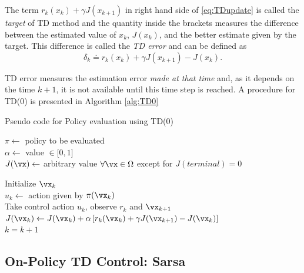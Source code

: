 The term $ r_k(x_k) +\gamma J(x_{k+1})$ in right hand side of \eqref{eq:TDupdate} is called the \textit{target} 
of TD method and the quantity inside the brackets measures the difference between the estimated value of $x_k$, 
$J(x_k)$, and the better estimate given by the target. This difference is called the \textit{TD error} and can be defined as
\begin{equation}
  \delta_k \doteq r_k(x_k) +\gamma J(x_{k+1}) - J(x_k)
  \label{eq:TDerror}.
\end{equation}

TD error measures the estimation error \textit{made at that time} and, as it depends on the time $k+1$, it is not available until this time step is reached. A procedure for TD(0) is presented in Algorithm \ref{alg:TD0}

\begin{algorithm} %
  \caption{Pseudo code for Policy evaluation using TD(0)}\label{alg:TD0}

  $\pi \gets $ policy to be evaluated \\
  $\alpha \gets $ value $\in \mathopen[0,1 \mathclose]$ \\
  $J(\vx) \gets$ arbitrary value $\forall \vx \in \Omega$ except for $J(terminal) = 0$

  {
    Initialize $\vx_k$ \\
    {
      $u_k \gets$ action given by $\pi(\vx_k)$ \\
      Take control action $u_k$, observe $r_k$ and $\vx_{k+1}$ \\
      $J(\vx_k) \gets J(\vx_k) + \alpha\left[r_k(\vx_k) + \gamma J(\vx_{k+1}) - J(\vx_k)\right]$ \\
      $k = k+1$
    }
  }
\end{algorithm}


\subsection{On-Policy TD Control: Sarsa} 
\label{sec:sarsa}


